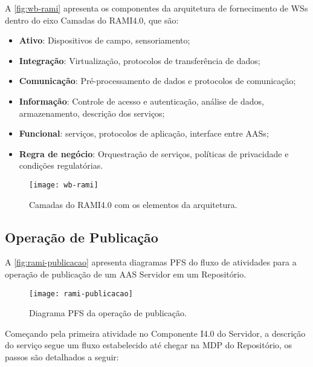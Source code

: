 	A \autoref{fig:wb-rami} apresenta os componentes da arquitetura de fornecimento de WSs dentro do eixo Camadas do RAMI4.0, que são:
	
	\begin{itemize}
		\item \textbf{Ativo}: Dispositivos de campo, sensoriamento; 
		\item \textbf{Integração}: Virtualização, protocolos de transferência de dados; 
		\item \textbf{Comunicação}: Pré-processamento de dados e protocolos de comunicação; 
		\item \textbf{Informação}: Controle de acesso e autenticação, análise de dados, armazenamento, descrição dos serviços;
		\item \textbf{Funcional}: serviços, protocolos de aplicação, interface entre AASs; 
		\item \textbf{Regra de negócio}: Orquestração de serviços, políticas de privacidade e condições regulatórias.
	\end{itemize}
	
	\begin{figure}[H]
		\centering
		\caption{Camadas do RAMI4.0 com os elementos da arquitetura.}
		\label{fig:wb-rami}
		\texttt{[image: wb-rami]}
	\end{figure}

\subsection{Operação de Publicação}

	A \autoref{fig:rami-publicacao} apresenta diagramas PFS do fluxo de atividades para a operação de publicação de um AAS Servidor em um Repositório.
	
	\begin{figure}[htb]
		\centering
		\caption{Diagrama PFS da operação de publicação.}
		\label{fig:rami-publicacao}
		\texttt{[image: rami-publicacao]}
	\end{figure}

	Começando pela primeira atividade no Componente I4.0 do Servidor, a descrição do serviço segue um fluxo estabelecido até chegar na MDP do Repositório, os passos são detalhados a seguir:
	
